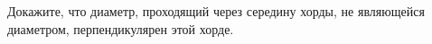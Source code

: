 \begin{ex}
	\begin{condition}
		Докажите, что диаметр, проходящий через середину хорды, не являющейся диаметром, перпендикулярен этой хорде.
	\end{condition}
\end{ex}